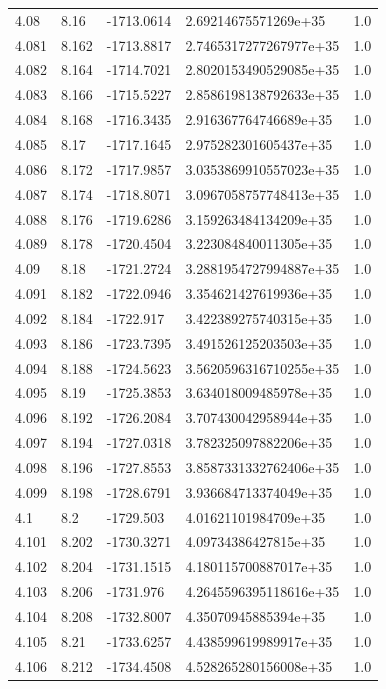 \begin{tabular}{lllll}
4.08 & 8.16 & -1713.0614 & 2.69214675571269e+35 & 1.0 \\
4.081 & 8.162 & -1713.8817 & 2.7465317277267977e+35 & 1.0 \\
4.082 & 8.164 & -1714.7021 & 2.8020153490529085e+35 & 1.0 \\
4.083 & 8.166 & -1715.5227 & 2.8586198138792633e+35 & 1.0 \\
4.084 & 8.168 & -1716.3435 & 2.916367764746689e+35 & 1.0 \\
4.085 & 8.17 & -1717.1645 & 2.975282301605437e+35 & 1.0 \\
4.086 & 8.172 & -1717.9857 & 3.0353869910557023e+35 & 1.0 \\
4.087 & 8.174 & -1718.8071 & 3.0967058757748413e+35 & 1.0 \\
4.088 & 8.176 & -1719.6286 & 3.159263484134209e+35 & 1.0 \\
4.089 & 8.178 & -1720.4504 & 3.223084840011305e+35 & 1.0 \\
4.09 & 8.18 & -1721.2724 & 3.2881954727994887e+35 & 1.0 \\
4.091 & 8.182 & -1722.0946 & 3.354621427619936e+35 & 1.0 \\
4.092 & 8.184 & -1722.917 & 3.422389275740315e+35 & 1.0 \\
4.093 & 8.186 & -1723.7395 & 3.491526125203503e+35 & 1.0 \\
4.094 & 8.188 & -1724.5623 & 3.5620596316710255e+35 & 1.0 \\
4.095 & 8.19 & -1725.3853 & 3.634018009485978e+35 & 1.0 \\
4.096 & 8.192 & -1726.2084 & 3.707430042958944e+35 & 1.0 \\
4.097 & 8.194 & -1727.0318 & 3.782325097882206e+35 & 1.0 \\
4.098 & 8.196 & -1727.8553 & 3.8587331332762406e+35 & 1.0 \\
4.099 & 8.198 & -1728.6791 & 3.936684713374049e+35 & 1.0 \\
4.1 & 8.2 & -1729.503 & 4.01621101984709e+35 & 1.0 \\
4.101 & 8.202 & -1730.3271 & 4.09734386427815e+35 & 1.0 \\
4.102 & 8.204 & -1731.1515 & 4.180115700887017e+35 & 1.0 \\
4.103 & 8.206 & -1731.976 & 4.2645596395118616e+35 & 1.0 \\
4.104 & 8.208 & -1732.8007 & 4.35070945885394e+35 & 1.0 \\
4.105 & 8.21 & -1733.6257 & 4.438599619989917e+35 & 1.0 \\
4.106 & 8.212 & -1734.4508 & 4.528265280156008e+35 & 1.0 \\

\end{tabular}

